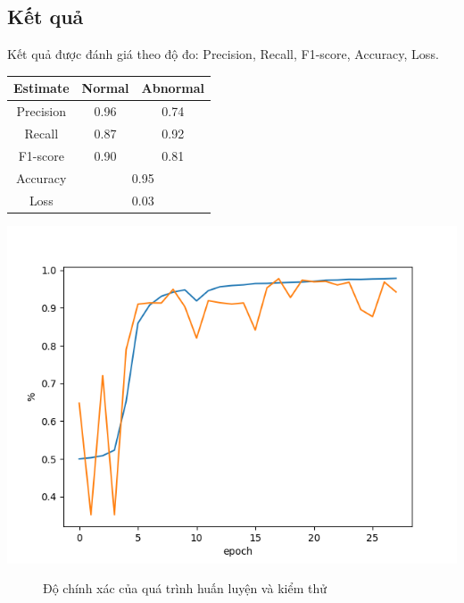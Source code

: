\subsection{Kết quả}
Kết quả được đánh giá theo độ đo: Precision, Recall, F1-score, Accuracy, Loss.
\begin{center}
    \begin{tabular}{|c|c|c|}
    \hline
    Estimate & Normal & Abnormal\\
    \hline 
    Precision & 0.96 & 0.74\\ 
    \hline 
    Recall & 0.87 & 0.92\\
    \hline 
    F1-score & 0.90 & 0.81\\
    \hline 
    Accuracy & \multicolumn{2}{|c|}{0.95} \\
    \hline 
    Loss & \multicolumn{2}{|c|}{0.03} \\
    \hline
    \end{tabular}
\end{center}
\begin{center}
    \includegraphics[scale=.6]{image/chapter6/acc.png}
    \begin{figure}[htp]
    \begin{center}
    \end{center}
    \caption{Độ chính xác của quá trình huấn luyện và kiểm thử}
    \end{figure}
\end{center}
